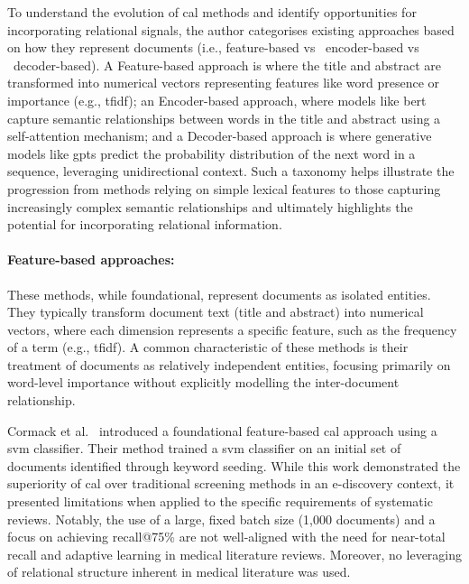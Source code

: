 \documentclass[10pt,oneside]{book}
\begin{document}
To understand the evolution of \gls*{cal} methods and identify opportunities for incorporating relational signals, the author categorises existing approaches based on how they represent documents (i.e., feature-based vs \ encoder-based vs \ decoder-based). A Feature-based approach is where the title and abstract are transformed into numerical vectors representing features like word presence or importance (e.g., \gls*{tfidf}); an Encoder-based approach, where models like \gls*{bert} capture semantic relationships between words in the title and abstract using a self-attention mechanism; and a Decoder-based approach is where generative models like \glspl*{gpt} predict the probability distribution of the next word in a sequence, leveraging unidirectional context. Such a taxonomy helps illustrate the progression from methods relying on simple lexical features to those capturing increasingly complex semantic relationships and ultimately highlights the potential for incorporating relational information.

\paragraph{Feature-based approaches:}
These methods, while foundational, represent documents as isolated entities. They typically transform document text (title and abstract) into numerical vectors, where each dimension represents a specific feature, such as the frequency of a term (e.g., \gls*{tfidf}). A common characteristic of these methods is their treatment of documents as relatively independent entities, focusing primarily on word-level importance without explicitly modelling the inter-document relationship.

Cormack et al.~\cite{cormack_evaluation_2014} introduced a foundational feature-based \gls*{cal} approach using a \gls*{svm} classifier. Their method trained a \gls*{svm} classifier on an initial set of documents identified through keyword seeding. While this work demonstrated the superiority of \gls*{cal} over traditional screening methods in an e-discovery context, it presented limitations when applied to the specific requirements of systematic reviews. Notably, the use of a large, fixed batch size (1,000 documents) and a focus on achieving recall@75\% are not well-aligned with the need for near-total recall and adaptive learning in medical literature reviews. Moreover, no leveraging of relational structure inherent in medical literature was used.
\end{document}
